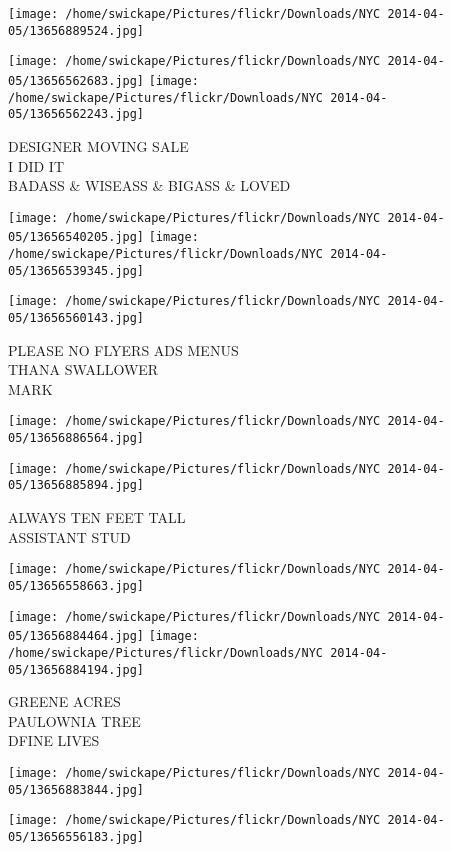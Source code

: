 \documentclass[10pt,letterpaper]{article}
\begin{document}
\texttt{[image: /home/swickape/Pictures/flickr/Downloads/NYC 2014-04-05/13656889524.jpg]}

\vspace{0.25in}
\texttt{[image: /home/swickape/Pictures/flickr/Downloads/NYC 2014-04-05/13656562683.jpg]}
\texttt{[image: /home/swickape/Pictures/flickr/Downloads/NYC 2014-04-05/13656562243.jpg]}

DESIGNER MOVING SALE\\
I DID IT\\
BADASS \& WISEASS \& BIGASS \& LOVED
\pagebreak

\texttt{[image: /home/swickape/Pictures/flickr/Downloads/NYC 2014-04-05/13656540205.jpg]}
\texttt{[image: /home/swickape/Pictures/flickr/Downloads/NYC 2014-04-05/13656539345.jpg]}

\vspace{0.25in}
\texttt{[image: /home/swickape/Pictures/flickr/Downloads/NYC 2014-04-05/13656560143.jpg]}

PLEASE NO FLYERS ADS MENUS\\
THANA SWALLOWER\\
MARK
\pagebreak

\texttt{[image: /home/swickape/Pictures/flickr/Downloads/NYC 2014-04-05/13656886564.jpg]}

\vspace{0.25in}
\texttt{[image: /home/swickape/Pictures/flickr/Downloads/NYC 2014-04-05/13656885894.jpg]}

ALWAYS TEN FEET TALL\\
ASSISTANT STUD
\pagebreak

\texttt{[image: /home/swickape/Pictures/flickr/Downloads/NYC 2014-04-05/13656558663.jpg]}

\vspace{0.25in}
\texttt{[image: /home/swickape/Pictures/flickr/Downloads/NYC 2014-04-05/13656884464.jpg]}
\texttt{[image: /home/swickape/Pictures/flickr/Downloads/NYC 2014-04-05/13656884194.jpg]}

GREENE ACRES\\
PAULOWNIA TREE\\
DFINE LIVES
\pagebreak

\texttt{[image: /home/swickape/Pictures/flickr/Downloads/NYC 2014-04-05/13656883844.jpg]}

\vspace{0.25in}
\texttt{[image: /home/swickape/Pictures/flickr/Downloads/NYC 2014-04-05/13656556183.jpg]}
\end{document}

